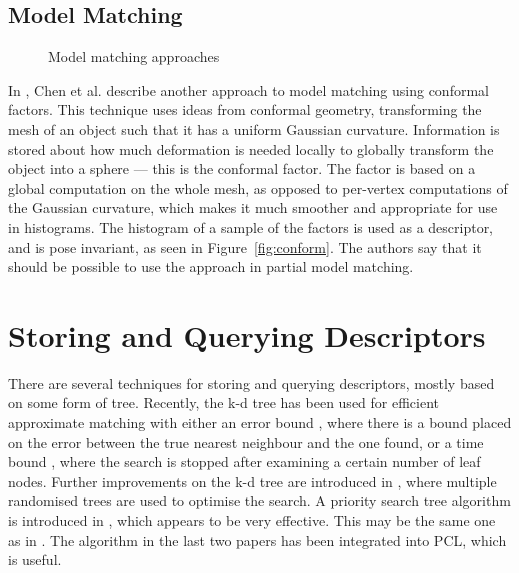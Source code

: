 \documentclass[11pt,a4paper]{kth-mag}
\begin{document}
\subsection{Model Matching}
\begin{figure}
  \centering
  \caption{Model matching approaches}
  \label{fig:modelmatch}
\end{figure}
In \cite{ben2008characterizing}, Chen et al. describe another approach to model
matching using conformal factors. This technique uses ideas from conformal
geometry, transforming the mesh of an object such that it has a uniform Gaussian
curvature. Information is stored about how much deformation is needed locally to
globally transform the object into a sphere --- this is the conformal factor.
The factor is based on a global computation on the whole mesh, as opposed to
per-vertex computations of the Gaussian curvature, which makes it much smoother
and appropriate for use in histograms. The histogram of a sample of the factors
is used as a descriptor, and is pose invariant, as seen in
Figure~\ref{fig:conform}. The authors say that it should be possible to use the
approach in partial model matching.

\section{Storing and Querying Descriptors}
There are several techniques for storing and querying descriptors, mostly based
on some form of tree. Recently, the k-d tree\cite{bentley1975multidimensional,
  friedman1977algorithm} has been used for efficient approximate matching with
either an error bound \cite{arya1998optimal}, where there is a bound placed on
the error between the true nearest neighbour and the one found, or a time bound
\cite{beis1997shape}, where the search is stopped after examining a certain
number of leaf nodes. Further improvements on the k-d tree are introduced in
\cite{silpa2008optimised}, where multiple randomised trees are used to optimise
the search. A priority search tree algorithm is introduced in
\cite{muja2014scalable}, which appears to be very effective. This may be the
same one as in \cite{muja2009fast}. The algorithm in the last two papers has
been integrated into PCL, which is useful.
\end{document}
